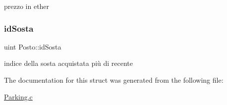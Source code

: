 prezzo in ether \mbox{\label{struct_posto_a612bd6f6aa55358575186039c087505b}} 
\subsubsection{\texorpdfstring{id\+Sosta}{idSosta}}
{\footnotesize\ttfamily uint Posto\+::id\+Sosta}

indice della sosta acquistata più di recente 

The documentation for this struct was generated from the following file\+:\begin{DoxyCompactItemize}
\item 
\mbox{\hyperlink{_parking_8c}{Parking.\+c}}\end{DoxyCompactItemize}
